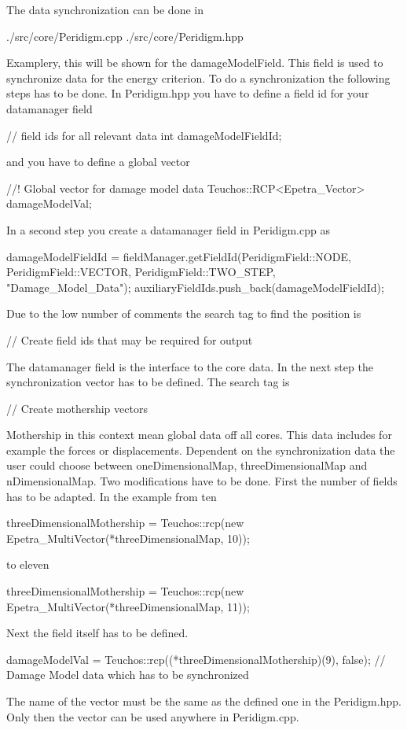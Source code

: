 The data synchronization can be done in 
\begingroup
\lstset{breaklines=true}
\begin{code}
./src/core/Peridigm.cpp
./src/core/Peridigm.hpp
\end{code}
\endgroup
Examplery, this will be shown for the damageModelField. This field is used to synchronize data for the energy criterion.
To do a synchronization the following steps has to be done. In Peridigm.hpp you have to define a field id for your datamanager field 
\begingroup
\lstset{breaklines=true}
\begin{code}
// field ids for all relevant data
int damageModelFieldId;
\end{code}
\endgroup
and you have to define a global vector
\begingroup
\lstset{breaklines=true}
\begin{code}
//! Global vector for damage model data
Teuchos::RCP<Epetra_Vector> damageModelVal;
\end{code}
\endgroup
In a second step you create a datamanager field in Peridigm.cpp as
\begingroup
\lstset{breaklines=true}
\begin{code}
damageModelFieldId = fieldManager.getFieldId(PeridigmField::NODE,    PeridigmField::VECTOR, PeridigmField::TWO_STEP, "Damage_Model_Data");
auxiliaryFieldIds.push_back(damageModelFieldId);
\end{code}
\endgroup
Due to the low number of comments the search tag to find the position is 
\begingroup
\lstset{breaklines=true}
\begin{code}
// Create field ids that may be required for output
\end{code}
\endgroup
The datamanager field is the interface to the core data. In the next step the synchronization vector has to be defined.
The search tag is 
\begingroup
\lstset{breaklines=true}
\begin{code}
// Create mothership vectors
\end{code}
\endgroup

Mothership in this context mean global data off all cores. This data includes for example the forces or displacements. Dependent on the synchronization data the user could choose between oneDimensionalMap, threeDimensionalMap and nDimensionalMap.
Two modifications have to be done. First the number of fields has to be adapted. In the example from ten
\begingroup
\lstset{breaklines=true}
\begin{code}
threeDimensionalMothership = Teuchos::rcp(new Epetra_MultiVector(*threeDimensionalMap, 10));
\end{code}
\endgroup
to eleven
\begingroup
\lstset{breaklines=true}
\begin{code}
threeDimensionalMothership = Teuchos::rcp(new Epetra_MultiVector(*threeDimensionalMap, 11));
\end{code}
\endgroup
Next the field itself has to be defined.
\begingroup
\lstset{breaklines=true}
\begin{code}
damageModelVal = Teuchos::rcp((*threeDimensionalMothership)(9), false);  // Damage Model data which has to be synchronized
\end{code}
\endgroup
The name of the vector must be the same as the defined one in the Peridigm.hpp. Only then the vector can be used anywhere in Peridigm.cpp.

